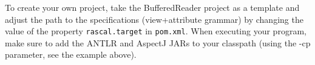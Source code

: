 \documentclass{article}
\begin{document}
To create your own project, take the BufferedReader project as a template and adjust the path to the specifications (view+attribute grammar) by changing the value of the property \lstinline+rascal.target+ in \lstinline+pom.xml+.  When executing your program, make sure to add the ANTLR and AspectJ JARs to your classpath (using the -cp parameter, see the example above).

%
%
%
%
%






\end{document}
